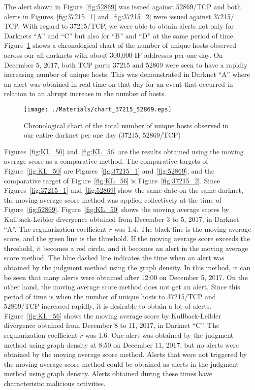 \documentclass[letterpaper]{sig-alternate-10pt}
\begin{document}
The alert shown in Figure~\ref{fig:52869} was issued against 52869/TCP and both alerts in Figures~\ref{fig:37215_1} and~\ref{fig:37215_2} were issued against 37215/ TCP.
With regard to 37215/TCP, we were able to obtain alerts not only for Darknets ``A'' and ``C'' but also for ``B'' and ``D'' at the same period of time.
Figure~\ref{fig:chart} shows a chronological chart of the number of unique hosts observed across our all darknets with about 300,000 IP addresses per one day.
On December 5, 2017, both TCP ports 37215 and 52869 were seen to have a rapidly increasing number of unique hosts.
This was demonstrated in Darknet ``A'' where an alert was obtained in real-time on that day for an event that occurred in relation to an abrupt increase in the number of hosts.

\begin{figure}[htb]
\begin{center}
	\texttt{[image: ./Materials/chart\_37215\_52869.eps]}
	\caption{Chronological chart of the total number of unique hosts observed in our entire darknet per one day (37215, 52869/TCP)}
  	\label{fig:chart}
\end{center}
\end{figure}

Figures~\ref{fig:KL_50} and~\ref{fig:KL_56} are the results obtained using the moving average score as a comparative method.
The comparative targets of Figure~\ref{fig:KL_50} are Figures~\ref{fig:37215_1} and~\ref{fig:52869}, and the comparative target of Figure~\ref{fig:KL_56} is Figure~\ref{fig:37215_2}.
Since Figures~\ref{fig:37215_1} and~\ref{fig:52869} show the same date on the same darknet, the moving average score method was applied collectively at the time of Figure~\ref{fig:52869}.
Figure~\ref{fig:KL_50} shows the moving average scores by Kullback-Leibler divergence obtained from December 3 to 5, 2017, in Darknet ``A''.
The regularization coefficient $r$ was 1.4.
The black line is the moving average score, and the green line is the threshold.
If the moving average score exceeds the threshold, it becomes a red circle, and it becomes an alert in the moving average score method.
The blue dashed line indicates the time when an alert was obtained by the judgment method using the graph density.
In this method, it can be seen that many alerts were obtained after 12:00 on December 5, 2017.
On the other hand, the moving average score method does not get an alert.
Since this period of time is when the number of unique hosts to 37215/TCP and 52869/TCP increased rapidly, it is desirable to obtain a lot of alerts.
Figure~\ref{fig:KL_56} shows the moving average score by Kullback-Leibler divergence obtained from December 8 to 11, 2017, in Darknet ``C''.
The regularization coefficient $r$ was 1.6.
One alert was obtained by the judgment method using graph density at 8:50 on December 11, 2017, but no alerts were obtained by the moving average score method.
Alerts that were not triggered by the moving average score method could be obtained as alerts in the judgment method using graph density.
Alerts obtained during these times have characteristic malicious activities.
\end{document}

